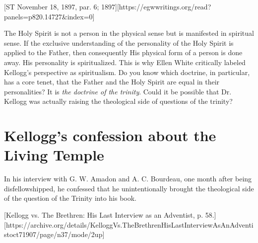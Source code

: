 [ST November 18, 1897, par. 6; 1897][https://egwwritings.org/read?panels=p820.14727&index=0]

The Holy Spirit is not a person in the physical sense but is manifested in spiritual sense. If the exclusive understanding of the personality of the Holy Spirit is applied to the Father, then consequently His physical form of a person is done away. His personality is spiritualized. This is why Ellen White critically labeled Kellogg's perspective as spiritualism. Do you know which doctrine, in particular, has a core tenet, that the Father and the Holy Spirit are equal in their personalities? It is \textit{the doctrine of the trinity}. Could it be possible that Dr. Kellogg was actually raising the theological side of questions of the trinity?

\section*{Kellogg’s confession about the Living Temple}

In his interview with G. W. Amadon and A. C. Bourdeau, one month after being disfellowshipped, he confessed that he unintentionally brought the theological side of the question of the Trinity into his book.

[Kellogg vs. The Brethren: His Last Interview as an Adventist, p. 58.][https://archive.org/details/KelloggVs.TheBrethrenHisLastInterviewAsAnAdventistoct71907/page/n37/mode/2up]

